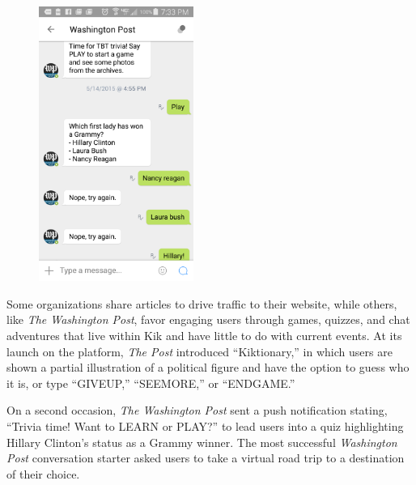 \documentclass[notoc, symmetric, nobib, nols]{towcenter-guideto-book}
\begin{document}
\begin{figure}
\includegraphics[width=0.45\textwidth]{graphics/CHATAPPS_Page19_Kik2.png} 
\end{figure}

Some organizations share articles to drive traffic to their website, while others, like \textit{The Washington Post}, favor engaging users through games, quizzes, and chat adventures that live within Kik and have little to do with current events. At its launch on the platform, \textit{The Post} introduced ``Kiktionary,'' in which users are shown a partial illustration of a political figure and have the option to guess who it is, or type ``GIVEUP,'' ``SEEMORE,'' or ``ENDGAME.''  

On a second occasion, \textit{The Washington Post} sent a push notification stating, ``Trivia time! Want to LEARN or PLAY?'' to lead users into a quiz highlighting Hillary Clinton's status as a Grammy winner. The most successful 
\textit{Washington Post} conversation starter asked users to take a virtual road trip to a destination of their choice.  



\end{document}
